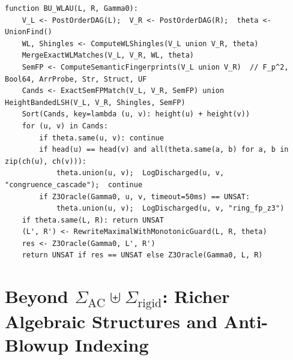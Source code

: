 \documentclass[11pt,a4paper]{article}
\begin{document}
\begin{lstlisting}[caption={Algorithm 7: Variant A (\texttt{BU-WLAU}) Implemented in \texttt{simp\_verify/unifier.py}.}]
function BU_WLAU(L, R, Gamma0):
    V_L <- PostOrderDAG(L);  V_R <- PostOrderDAG(R);  theta <- UnionFind()
    WL, Shingles <- ComputeWLShingles(V_L union V_R, theta)
    MergeExactWLMatches(V_L, V_R, WL, theta)
    SemFP <- ComputeSemanticFingerprints(V_L union V_R)  // F_p^2, Bool64, ArrProbe, Str, Struct, UF
    Cands <- ExactSemFPMatch(V_L, V_R, SemFP) union HeightBandedLSH(V_L, V_R, Shingles, SemFP)
    Sort(Cands, key=lambda (u, v): height(u) + height(v))
    for (u, v) in Cands:
        if theta.same(u, v): continue
        if head(u) == head(v) and all(theta.same(a, b) for a, b in zip(ch(u), ch(v))):
            theta.union(u, v);  LogDischarged(u, v, "congruence_cascade");  continue
        if Z3Oracle(Gamma0, u, v, timeout=50ms) == UNSAT:
            theta.union(u, v);  LogDischarged(u, v, "ring_fp_z3")
    if theta.same(L, R): return UNSAT
    (L', R') <- RewriteMaximalWithMonotonicGuard(L, R, theta)
    res <- Z3Oracle(Gamma0, L', R')
    return UNSAT if res == UNSAT else Z3Oracle(Gamma0, L, R)
\end{lstlisting}

\section{Beyond $\Sigma_{\text{AC}} \uplus \Sigma_{\text{rigid}}$: Richer Algebraic Structures and Anti-Blowup Indexing}
\label{sec:richer}
\end{document}
